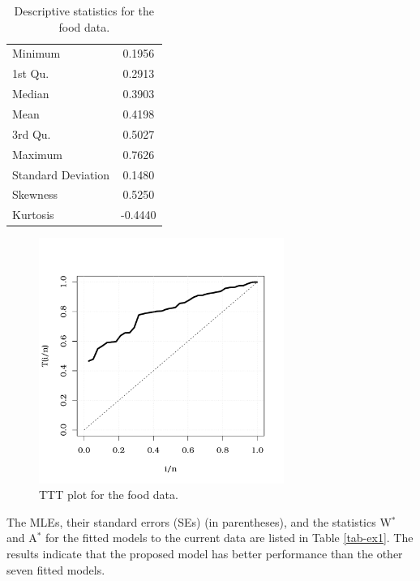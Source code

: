 \documentclass[twoside,leqno,11pt]{article}
\begin{document}
\begin{table}[H] 
\center
\caption{Descriptive statistics for the food data.}
\label{tabds}
\begin{tabular}{lc}
\hline\noalign{\smallskip}
   Minimum &  0.1956\\
   1st Qu.& 0.2913 \\
   Median&  0.3903 \\
   Mean& 0.4198\\
   3rd  Qu.&    0.5027\\
   Maximum & 0.7626\\
   Standard Deviation & 0.1480\\
   Skewness & 0.5250\\
   Kurtosis &-0.4440\\
   \hline

\end{tabular}
\end{table}



\begin{figure}[H]
\begin{center}
\includegraphics[height=8cm, width=8cm]{TTT_app_1.pdf}
\caption{TTT plot for the food data.\label{ttt}}
\end{center}
\end{figure}


The MLEs, their standard errors (SEs) (in parentheses), and the statistics W$^{*}$ and A$^{*}$ for the fitted models to the current data are listed in Table \ref{tab-ex1}. The results indicate that the proposed model has better performance than the other seven fitted models.
\end{document}
